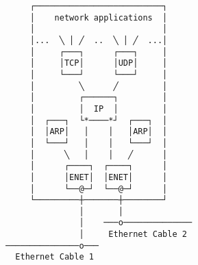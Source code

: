 \documentclass[varwidth,crop]{standalone}
\begin{document}
\begin{verbatim}
     ┌──────────────────────────┐
     │    network applications  │
     │                          │
     │...  ╲ │ ╱  ..  ╲ │ ╱  ...│
     │     ┌───┐      ┌───┐     │
     │     │TCP│      │UDP│     │
     │     └───┘      └───┘     │
     │         ╲      ╱         │
     │         ┌──────┐         │
     │         │  IP  │         │
     │  ┌───┐  └*────*┘  ┌───┐  │
     │  │ARP│   │    │   │ARP│  │
     │  └───┘   │    │   └───┘  │
     │      ╲   │    │   ╱      │
     │      ┌────┐  ┌────┐      │
     │      │ENET│  │ENET│      │
     │      └──@─┘  └──@─┘      │
     └─────────┼───────┼────────┘
               │       │
               │    ───o──────────────
               │     Ethernet Cable 2
───────────────o───
  Ethernet Cable 1
\end{verbatim}
\end{document}
